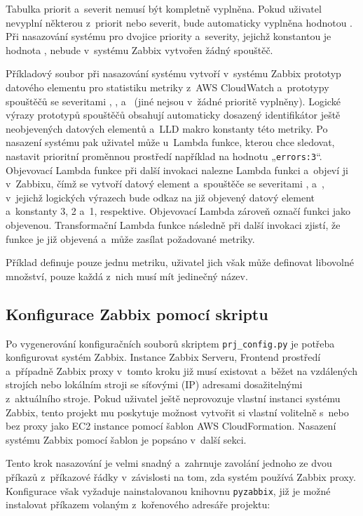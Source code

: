 \documentclass[czech, ing, kiv, he, iso690]{fasthesis}
\begin{document}
Tabulka priorit a~severit nemusí být kompletně vyplněna. Pokud uživatel nevyplní některou z~priorit nebo severit, bude automaticky vyplněna hodnotou . Při nasazování systému pro dvojice priority a~severity, jejichž konstantou je hodnota , nebude v~systému Zabbix vytvořen žádný spouštěč.

Příkladový soubor při nasazování systému vytvoří v~systému Zabbix prototyp datového elementu pro statistiku  metriky  z~AWS CloudWatch a~prototypy spouštěčů se severitami , ,  a~ (jiné nejsou v~žádné prioritě vyplněny). Logické výrazy prototypů spouštěčů obsahují automaticky dosazený identifikátor ještě neobjevených datových elementů a~LLD makro konstanty této metriky. Po nasazení systému pak uživatel může u~Lambda funkce, kterou chce sledovat, nastavit prioritní proměnnou prostředí například na hodnotu „\verb|errors:3|“. Objevovací Lambda funkce při další invokaci nalezne Lambda funkci a~objeví ji v~Zabbixu, čímž se vytvoří datový element a~spouštěče se severitami ,  a~, v~jejichž logických výrazech bude odkaz na již objevený datový element a~konstanty 3, 2 a~1, respektive. Objevovací Lambda zároveň označí funkci jako objevenou. Transformační Lambda funkce následně při další invokaci zjistí, že funkce je již objevená a~může zasílat požadované metriky.

Příklad definuje pouze jednu metriku, uživatel jich však může definovat libovolné množství, pouze každá z~nich musí mít jedinečný název.

\subsection{Konfigurace Zabbix pomocí skriptu}

Po vygenerování konfiguračních souborů skriptem \verb|prj_config.py| je potřeba konfigurovat systém Zabbix. Instance Zabbix Serveru, Frontend prostředí a~případně Zabbix proxy v~tomto kroku již musí existovat a~běžet na vzdálených strojích nebo lokálním stroji se síťovými (IP) adresami dosažitelnými z~aktuálního stroje. Pokud uživatel ještě neprovozuje vlastní instanci systému Zabbix, tento projekt mu poskytuje možnost vytvořit si vlastní volitelně s~nebo bez proxy jako EC2 instance pomocí šablon AWS CloudFormation. Nasazení systému Zabbix pomocí šablon je popsáno v~další sekci.

Tento krok nasazování je velmi snadný a~zahrnuje zavolání jednoho ze dvou příkazů z~příkazové řádky v~závislosti na tom, zda systém používá Zabbix proxy. Konfigurace však vyžaduje nainstalovanou knihovnu \verb|pyzabbix|, již je možné instalovat příkazem volaným z~kořenového adresáře projektu:
\end{document}
